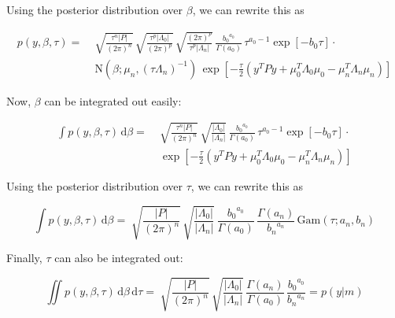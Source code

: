 Using the posterior distribution over $\beta$, we can rewrite this as

\vspace{-0.5em}
\begin{equation} \label{eq:GLM-NG-LME2}
\begin{split}
p(y,\beta,\tau) = \; & \sqrt{\frac{\tau^n |P|}{(2 \pi)^n}} \, \sqrt{\frac{\tau^p |\Lambda_0|}{(2 \pi)^p}} \, \sqrt{\frac{(2 \pi)^p}{\tau^p |\Lambda_n|}} \, \frac{{b_0}^{a_0}}{\Gamma(a_0)} \, \tau^{a_0-1} \exp[-b_0 \tau] \cdot \\
& \mathrm{N}(\beta; \mu_n, (\tau \Lambda_n)^{-1}) \, \exp\left[ -\frac{\tau}{2} (y^T P y + \mu_0^T \Lambda_0 \mu_0 - \mu_n^T \Lambda_n \mu_n) \right]
\end{split}
\end{equation}

Now, $\beta$ can be integrated out easily:

\vspace{-0.5em}
\begin{equation} \label{eq:GLM-NG-LME3}
\begin{split}
\int p(y,\beta,\tau) \, \mathrm{d}\beta = \; & \sqrt{\frac{\tau^n |P|}{(2 \pi)^n}} \, \sqrt{\frac{|\Lambda_0|}{|\Lambda_n|}} \, \frac{{b_0}^{a_0}}{\Gamma(a_0)} \, \tau^{a_0-1} \exp[-b_0 \tau] \cdot \\
& \exp\left[ -\frac{\tau}{2} (y^T P y + \mu_0^T \Lambda_0 \mu_0 - \mu_n^T \Lambda_n \mu_n) \right]
\end{split}
\end{equation}

Using the posterior distribution over $\tau$, we can rewrite this as

\begin{equation} \label{eq:GLM-NG-LME4}
\int p(y,\beta,\tau) \, \mathrm{d}\beta = \; \sqrt{\frac{|P|}{(2 \pi)^n}} \, \sqrt{\frac{|\Lambda_0|}{|\Lambda_n|}} \, \frac{{b_0}^{a_0}}{\Gamma(a_0)} \, \frac{\Gamma(a_n)}{{b_n}^{a_n}} \, \mathrm{Gam}(\tau; a_n, b_n)
\end{equation}

Finally, $\tau$ can also be integrated out:

\begin{equation} \label{eq:GLM-NG-LME5}
\iint p(y,\beta,\tau) \, \mathrm{d}\beta \, \mathrm{d}\tau = \; \sqrt{\frac{|P|}{(2 \pi)^n}} \, \sqrt{\frac{|\Lambda_0|}{|\Lambda_n|}} \, \frac{\Gamma(a_n)}{\Gamma(a_0)} \, \frac{{b_0}^{a_0}}{{b_n}^{a_n}} = p(y|m)
\end{equation}

